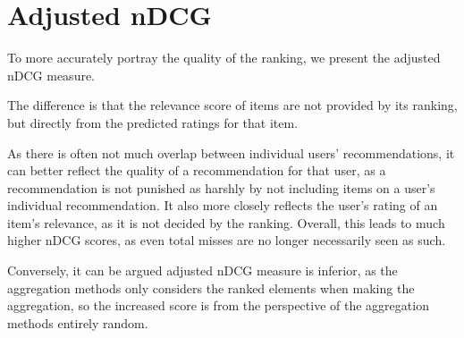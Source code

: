 \section{Adjusted nDCG}
To more accurately portray the quality of the ranking, we present the adjusted nDCG measure.

The difference is that the relevance score of items are not provided by its ranking, but directly from the predicted ratings for that item.

As there is often not much overlap between individual users' recommendations, it can better reflect the quality of a recommendation for that user, as a recommendation is not punished as harshly by not including items on a user's individual recommendation. It also more closely reflects the user's rating of an item's relevance, as it is not decided by the ranking. Overall, this leads to much higher nDCG scores, as even total misses are no longer necessarily seen as such.

Conversely, it can be argued adjusted nDCG measure is inferior, as the aggregation methods only considers the ranked elements when making the aggregation, so the increased score is from the perspective of the aggregation methods entirely random.